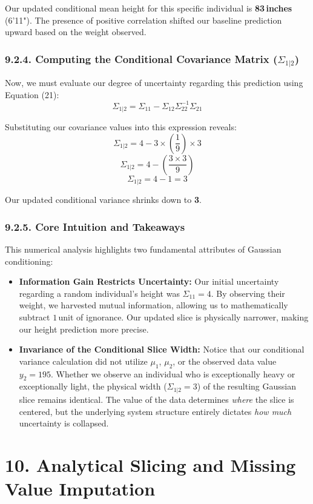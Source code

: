 \documentclass{article}
\begin{document}
Our updated conditional mean height for this specific individual is \textbf{83\,inches} (6'11"). The presence of positive correlation shifted our baseline prediction upward based on the weight observed.

\subsubsection*{9.2.4. Computing the Conditional Covariance Matrix ($\Sigma_{1|2}$)}

Now, we must evaluate our degree of uncertainty regarding this prediction using Equation (21):
\[ \Sigma_{1|2} = \Sigma_{11} - \Sigma_{12}\Sigma_{22}^{-1}\Sigma_{21} \]

Substituting our covariance values into this expression reveals:
\[ \Sigma_{1|2} = 4 - 3 \times \left(\frac{1}{9}\right) \times 3 \]
\[ \Sigma_{1|2} = 4 - \left( \frac{3 \times 3}{9} \right) \]
\[ \Sigma_{1|2} = 4 - 1 = 3 \]

Our updated conditional variance shrinks down to \textbf{3}. 

\subsubsection*{9.2.5. Core Intuition and Takeaways}

This numerical analysis highlights two fundamental attributes of Gaussian conditioning:
\begin{itemize}
    \item \textbf{Information Gain Restricts Uncertainty:} Our initial uncertainty regarding a random individual's height was $\Sigma_{11} = 4$. By observing their weight, we harvested mutual information, allowing us to mathematically subtract $1$\,unit of ignorance. Our updated slice is physically narrower, making our height prediction more precise.
    \item \textbf{Invariance of the Conditional Slice Width:} Notice that our conditional variance calculation did not utilize $\mu_1$, $\mu_2$, or the observed data value $y_2 = 195$. Whether we observe an individual who is exceptionally heavy or exceptionally light, the physical width ($\Sigma_{1|2} = 3$) of the resulting Gaussian slice remains identical. The value of the data determines \textit{where} the slice is centered, but the underlying system structure entirely dictates \textit{how much} uncertainty is collapsed.
\end{itemize}

\section*{10. Analytical Slicing and Missing Value Imputation}
\end{document}
